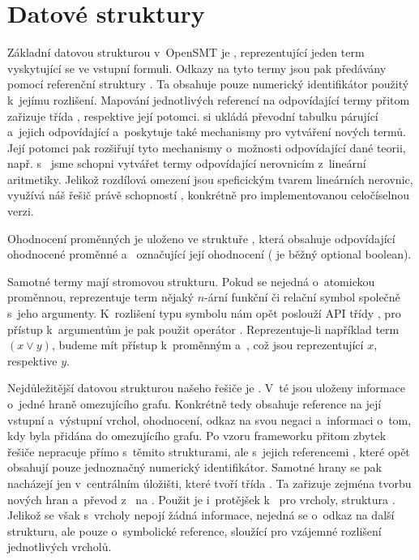 \section{Datové struktury}\label{data}

Základní datovou strukturou v~OpenSMT je , reprezentující jeden term vyskytující se ve vstupní formuli. Odkazy na tyto termy jsou pak předávány pomocí referenční struktury . Ta obsahuje pouze numerický identifikátor použitý k~jejímu rozlišení. Mapování jednotlivých referencí na odpovídající termy přitom zařizuje třída , respektive její potomci.  si ukládá převodní tabulku párující  a~jejich odpovídající  a~poskytuje také mechanismy pro vytváření nových termů. Její potomci pak rozšiřují tyto mechanismy o~možnosti odpovídající dané teorii, např. s~ jsme schopni vytvářet termy odpovídající nerovnicím z~lineární aritmetiky. Jelikož rozdílová omezení jsou speficickým tvarem lineárních nerovnic, využívá náš řešič právě schopností , konkrétně  pro implementovanou celočíselnou verzi.

Ohodnocení proměnných je uloženo ve struktuře , která obsahuje  odpovídající ohodnocené proměnné a~ označující její ohodnocení ( je běžný optional boolean).

Samotné termy mají stromovou strukturu. Pokud se nejedná o~atomickou proměnnou, reprezentuje term nějaký $n$-ární funkční či relační symbol společně s~jeho argumenty. K~rozlišení typu symbolu nám opět poslouží API třídy , pro přístup k~argumentům je pak použit operátor \mono{[]}. Reprezentuje-li například  term $(x \lor y)$, budeme mít přístup k~proměnným  a~, což jsou  reprezentující $x$, respektive $y$. 

Nejdůležitější datovou strukturou našeho řešiče je . V~té jsou uloženy informace o~jedné hraně omezujícího grafu. Konkrétně tedy obsahuje reference na její vstupní a~výstupní vrchol, ohodnocení, odkaz na svou negaci a~informaci o~tom, kdy byla přidána do omezujícího grafu. Po vzoru frameworku přitom zbytek řešiče nepracuje přímo s~těmito strukturami, ale s~jejich referencemi , které opět obsahují pouze jednoznačný numerický identifikátor. Samotné hrany se pak nacházejí jen v~centrálním úložišti, které tvoří třída . Ta zařizuje zejména tvorbu nových hran a~převod z~ na . Použit je i~protějšek k~ pro vrcholy, struktura . Jelikož se však s~vrcholy nepojí žádná informace, nejedná se o~odkaz na další strukturu, ale pouze o~symbolické reference, sloužící pro vzájemné rozlišení jednotlivých vrcholů.

